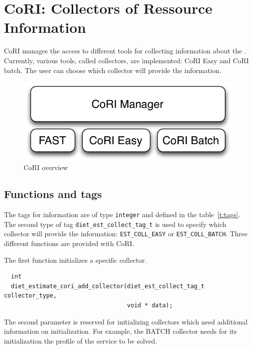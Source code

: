 \section{CoRI: Collectors of Ressource Information}
\label{sec:CORI}

CoRI manages the access to different tools for collecting information about the
\sed. Currently, various tools, called collectors, are implemented: CoRI
Easy and CoRI batch. The user can choose which collector will provide the
information.

\begin{figure}[h]
  \begin{center}
    \includegraphics[scale=0.5]{fig/overviewCori}
    \caption{CoRI overview}
    \label{fig:cori-overview}
  \end{center}
\end{figure}

\subsection{Functions and tags}
The tags for information are of type \texttt{integer} and defined in the
table~\ref{t:tags}. The second type of tag \texttt{diet\_est\_collect\_tag\_t}
is used to specify which collector will provide the information:
\texttt{EST\_COLL\_EASY} or \texttt{EST\_COLL\_BATCH}.
Three different functions are provided with CoRI.

The first function initializes a specific collector.

\footnotesize
\begin{verbatim}
  int
  diet_estimate_cori_add_collector(diet_est_collect_tag_t collector_type,
                                   void * data);
\end{verbatim}
\normalsize The second parameter is reserved for initializing collectors which
need additional information on initialization. For example, the BATCH collector
needs for its initialization the profile of the service to be solved.

